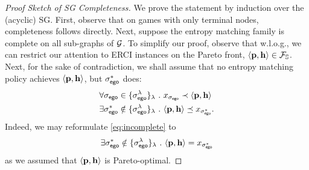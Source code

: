 \begin{proof}[Proof Sketch of SG Completeness]
  We prove the statement by induction over the (acyclic) SG.
  First, observe that on games with only terminal nodes, completeness
  follows directly.  Next, suppose the entropy matching family is
  complete on all sub-graphs of $\mathcal{G}$. To simplify our proof, observe
  that w.l.o.g., we can restrict our attention to ERCI instances
  on the Pareto front, $\langle \mathbf{p},\mathbf{h}\rangle \in \mathcal{F}_{\mathbb{S}}$.
  Next, for the sake of contradiction, we shall assume that no entropy
  matching policy achieves $\langle \mathbf{p},\mathbf{h}\rangle$,
  but $\sigma_{\mathsf{ego}}^*$ does:
  \begin{align}
    &\forall \sched_\pOne \in \{\sched_{\pOne}^\rat\}_\rat~.~ x_{\sched_{\pOne}} \prec \langle \scthreshold, \randomness \rangle\label{eq:reject}\\
    &\exists \sched_\pOne^* \notin \{\sched_{\pOne}^\rat\}_\rat~.~  \langle \scthreshold, \randomness \rangle \preceq x_{\sched_{\pOne}^*}\label{eq:incomplete}.
  \end{align}
  Indeed, we may reformulate \eqref{eq:incomplete} to 
  \begin{align}
  	\exists \sched_\pOne^* \notin \{\sched_{\pOne}^\rat\}_\rat~.~  \langle \scthreshold, \randomness \rangle = x_{\sched_{\pOne}^*}\label{eq:incompleteeq}
  \end{align}
as we assumed that $\langle \mathbf{p}, \mathbf{h} \rangle$ is Pareto-optimal.
  

\end{proof}
